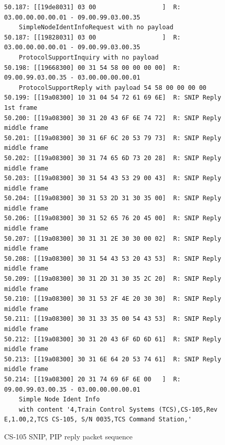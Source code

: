 \documentclass[11pt]{article}
\begin{document}
\begin{figure}[!htbp]
\begin{verbatim}
50.187: [[19de8031] 03 00                  ]  R: 03.00.00.00.00.01 - 09.00.99.03.00.35 
    SimpleNodeIdentInfoRequest with no payload
50.187: [[19828031] 03 00                  ]  R: 03.00.00.00.00.01 - 09.00.99.03.00.35 
    ProtocolSupportInquiry with no payload
50.198: [[19668300] 00 31 54 58 00 00 00 00]  R: 09.00.99.03.00.35 - 03.00.00.00.00.01 
    ProtocolSupportReply with payload 54 58 00 00 00 00
50.199: [[19a08300] 10 31 04 54 72 61 69 6E]  R: SNIP Reply 1st frame
50.200: [[19a08300] 30 31 20 43 6F 6E 74 72]  R: SNIP Reply middle frame
50.201: [[19a08300] 30 31 6F 6C 20 53 79 73]  R: SNIP Reply middle frame
50.202: [[19a08300] 30 31 74 65 6D 73 20 28]  R: SNIP Reply middle frame
50.203: [[19a08300] 30 31 54 43 53 29 00 43]  R: SNIP Reply middle frame
50.204: [[19a08300] 30 31 53 2D 31 30 35 00]  R: SNIP Reply middle frame
50.206: [[19a08300] 30 31 52 65 76 20 45 00]  R: SNIP Reply middle frame
50.207: [[19a08300] 30 31 31 2E 30 30 00 02]  R: SNIP Reply middle frame
50.208: [[19a08300] 30 31 54 43 53 20 43 53]  R: SNIP Reply middle frame
50.209: [[19a08300] 30 31 2D 31 30 35 2C 20]  R: SNIP Reply middle frame
50.210: [[19a08300] 30 31 53 2F 4E 20 30 30]  R: SNIP Reply middle frame
50.211: [[19a08300] 30 31 33 35 00 54 43 53]  R: SNIP Reply middle frame
50.212: [[19a08300] 30 31 20 43 6F 6D 6D 61]  R: SNIP Reply middle frame
50.213: [[19a08300] 30 31 6E 64 20 53 74 61]  R: SNIP Reply middle frame
50.214: [[19a08300] 20 31 74 69 6F 6E 00   ]  R: 09.00.99.03.00.35 - 03.00.00.00.00.01 
    Simple Node Ident Info 
    with content '4,Train Control Systems (TCS),CS-105,Rev E,1.00,2,TCS CS-105, S/N 0035,TCS Command Station,'
\end{verbatim}
\caption{CS-105 SNIP, PIP reply packet sequence}
\label{fig:CS105_SNIP_PIP_reply_sequence}
\end{figure}
\end{document}
